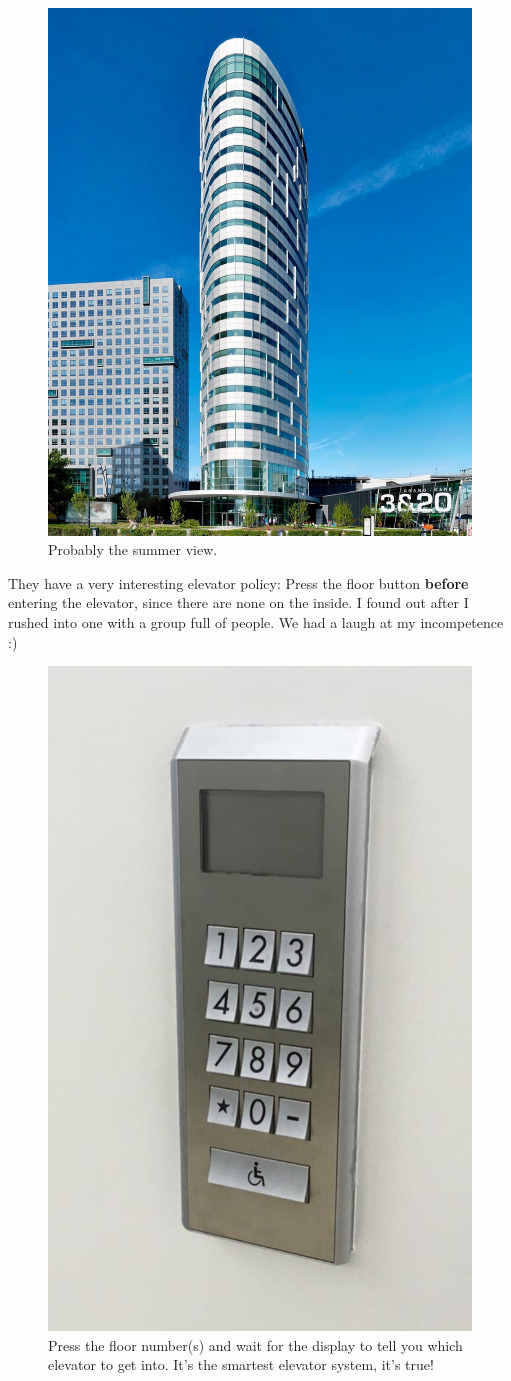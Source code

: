 \documentclass[11pt,a4paper,sans]{report} %
\begin{document}
\begin{figure}[hpt]
	\centering
	\includegraphics[width=0.5\linewidth]{images/amsovaltower/ovaltower}
	\caption{Probably the summer view.}
	\label{fig.ovaltower}
\end{figure}

They have a very interesting elevator policy: Press the floor button \textbf{before} entering the elevator, since there are none on the inside. I found out after I rushed into one with a group full of people. We had a laugh at my incompetence :)

\begin{figure}[hpt]
	\centering
	\label{fig.elevator}
		\includegraphics[width=0.40\linewidth]{images/amsovaltower/liftknoppen}
	\caption{Press the floor number(s) and wait for the display to tell you which elevator to get into. It's the smartest elevator system, it's true!}
\end{figure}

\end{document}
